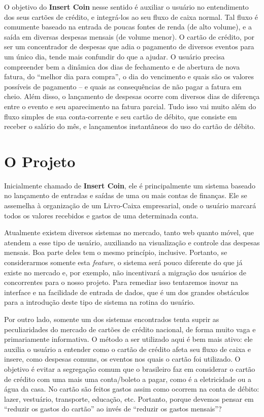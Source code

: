 \documentclass[a4paper]{abnt}
\begin{document}
O objetivo do \textbf{Insert Coin} nesse sentido é auxiliar o usuário no entendimento dos seus cartões de crédito, e integrá-los ao seu fluxo de caixa normal. Tal fluxo é comumente baseado na entrada de poucas fontes de renda (de alto volume), e a saída em diversas despesas mensais (de volume menor). O cartão de crédito, por ser um concentrador de despesas que adia o pagamento de diversos eventos para um único dia, tende mais confundir do que a ajudar. O usuário precisa compreender bem a dinâmica dos dias de fechamento e de abertura de nova fatura, do ``melhor dia para compra'', o dia do vencimento e quais são os valores possíveis de pagamento – e quais as consequências de não pagar a fatura em cheio. Além disso, o lançamento de despesas ocorre com diversos dias de diferença entre o evento e seu aparecimento na fatura parcial. Tudo isso vai muito além do fluxo simples de sua conta-corrente e seu cartão de débito, que consiste em receber o salário do mês, e lançamentos instantâneos do uso do cartão de débito.

\section{O Projeto}

Inicialmente chamado de \textbf{Insert Coin}, ele é principalmente um sistema baseado no lançamento de entradas e saídas de uma ou mais contas de finanças. Ele se assemelha à organização de um Livro-Caixa empresarial, onde o usuário marcará todos os valores recebidos e gastos de uma determinada conta. 

Atualmente existem diversos sistemas no mercado, tanto web quanto móvel, que atendem a esse tipo de usuário, auxiliando na visualização e controle das despesas mensais. Boa parte deles tem o mesmo princípio, inclusive. Portanto, se considerarmos somente esta \emph{feature}, o sistema será pouco diferente do que já existe no mercado e, por exemplo, não incentivará a migração dos usuários de concorrentes para o nosso projeto. Para remediar isso tentaremos inovar na interface e na facilidade de entrada de dados, que é um dos grandes obstáculos para a introdução deste tipo de sistema na rotina do usuário.

Por outro lado, somente um dos sistemas encontrados tenta suprir as peculiaridades do mercado de cartões de crédito nacional, de forma muito vaga e primariamente informativa. O método a ser utilizado aqui é bem mais ativo: ele auxilia o usuário a entender como o cartão de crédito afeta seu fluxo de caixa e insere, como despesas comuns, os eventos nos quais o cartão foi utilizado. O objetivo é evitar a segregação comum que o brasileiro faz em considerar o cartão de crédito com uma mais uma conta/boleto a pagar, como é a eletricidade ou a água da casa. No cartão são feitos gastos assim como ocorrem na conta de débito: lazer, vestuário, transporte, educação, etc. Portanto, porque devemos pensar em ``reduzir os gastos do cartão'' ao invés de ``reduzir os gastos mensais''?
\end{document}
